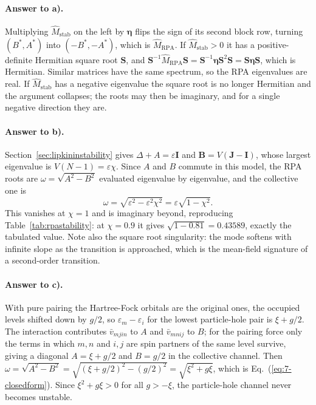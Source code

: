 \paragraph{Answer to a).}
Multiplying $\hat{M}_{\mathrm{stab}}$ on the left by $\bm{\eta}$ flips the
sign of its second block row, turning $(B^{*},A^{*})$ into
$(-B^{*},-A^{*})$, which is $\hat{M}_{\mathrm{RPA}}$.  If
$\hat{M}_{\mathrm{stab}}>0$ it has a positive-definite Hermitian square root
$\bm{S}$, and
$\bm{S}^{-1}\hat{M}_{\mathrm{RPA}}\bm{S}
=\bm{S}^{-1}\bm{\eta}\bm{S}^{2}\bm{S}
=\bm{S}\bm{\eta}\bm{S}$, which is Hermitian.  Similar matrices have the same
spectrum, so the RPA eigenvalues are real.  If $\hat{M}_{\mathrm{stab}}$ has a
negative eigenvalue the square root is no longer Hermitian and the argument
collapses; the roots may then be imaginary, and for a single negative
direction they are.

\paragraph{Answer to b).}
Section~\ref{sec:lipkininstability} gives
$\Delta+A=\varepsilon\bm{I}$ and $\bm{B}=V(\bm{J}-\bm{I})$, whose largest
eigenvalue is $V(N-1)=\varepsilon\chi$.  Since $A$ and $B$ commute in this
model, the RPA roots are
$\omega=\sqrt{A^2-B^2}$ evaluated eigenvalue by eigenvalue, and the collective
one is
\begin{equation}
  \omega = \sqrt{\varepsilon^2-\varepsilon^2\chi^2}
   = \varepsilon\sqrt{1-\chi^2}.
  \label{eq:7-exb3}
\end{equation}
This vanishes at $\chi=1$ and is imaginary beyond, reproducing
Table~\ref{tab:rpastability}: at $\chi=0.9$ it gives
$\sqrt{1-0.81}=0.43589$, exactly the tabulated value.  Note also the square
root singularity: the mode softens with infinite slope as the transition is
approached, which is the mean-field signature of a second-order transition.

\paragraph{Answer to c).}
With pure pairing the Hartree-Fock orbitals are the original ones, the
occupied levels shifted down by $g/2$, so $\varepsilon_m-\varepsilon_i$ for
the lowest particle-hole pair is $\xi+g/2$.  The interaction contributes
$\bar{v}_{mjin}$ to $A$ and $\bar{v}_{mnij}$ to $B$; for the pairing force
only the terms in which $m,n$ and $i,j$ are spin partners of the same level
survive, giving a diagonal $A=\xi+g/2$ and $B=g/2$ in the collective channel.
Then $\omega=\sqrt{A^2-B^2}=\sqrt{(\xi+g/2)^2-(g/2)^2}=\sqrt{\xi^2+g\xi}$,
which is Eq.~(\ref{eq:7-closedform}).  Since $\xi^2+g\xi>0$ for all $g>-\xi$,
the particle-hole channel never becomes unstable.

